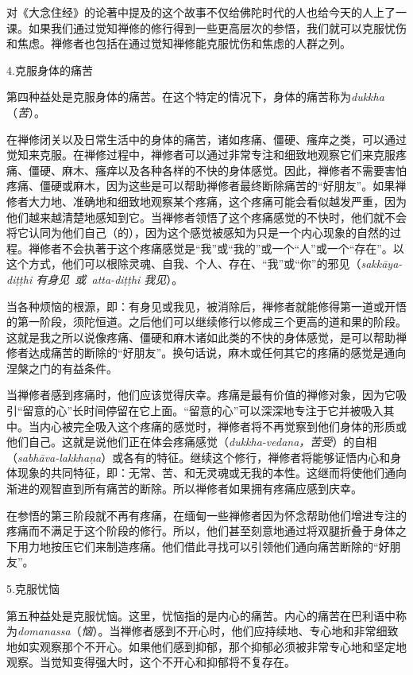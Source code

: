 对《大念住经》的论著中提及的这个故事不仅给佛陀时代的人也给今天的人上了一课。如果我们通过觉知禅修的修行得到一些更高层次的参悟，我们就可以克服忧伤和焦虑。禅修者也包括在通过觉知禅修能克服忧伤和焦虑的人群之列。

\sssubsectnon 4.克服身体的痛苦

第四种益处是克服身体的痛苦。在这个特定的情况下，身体的痛苦称为{\it dukkha}（{\it 苦}）。

在禅修闭关以及日常生活中的身体的痛苦，诸如疼痛、僵硬、瘙痒之类，可以通过觉知来克服。在禅修过程中，禅修者可以通过非常专注和细致地观察它们来克服疼痛、僵硬、\1麻木、瘙痒以及各种各样的不快的身体感觉。因此，禅修者不需要害怕疼痛、僵硬或麻木，因为这些是可以帮助禅修者最终断除痛苦的“好朋友”。如果禅修者大力地、准确地和细致地观察某个疼痛，这个疼痛可能会看似越发严重，因为他们越来越清楚地感知到它。当禅修者领悟了这个疼痛感觉的不快时，他们就不会将它认同为他们自己（的），因为这个感觉被感知为只是一个内心现象的自然的过程。禅修者不会执著于这个疼痛感觉是“我”或“我的”或一个“人”或一个“存在”。以这个方式，他们可以根除灵魂、自我、个人、存在、“我”或“你”的邪见（{\it sakk\=aya-di\d t\d thi 有身见\ 或\ atta-di\d t\d thi 我见}）。

当各种烦恼的根源，即：有身见或我见，被消除后，禅修者就能修得第一道或开悟的第一阶段，须陀恒道。之后他们可以继续修行以修成三个更高的道和果的阶段。这就是我之所以说像疼痛、僵硬和麻木诸如此类的不快的身体感觉，是可以帮助禅修者达成痛苦的断除的“好朋友”。换句话说，麻木或任何其它的疼痛的感觉是通向涅槃之门的有益条件。

当禅修者感到疼痛时，他们应该觉得庆幸。疼痛是最有价值的禅修对象，因为它吸引“留意的心”长时间停留在它上面。“留意的心”可以深深地专注于它并被吸入其中。当内心被完全吸入这个疼痛的感觉时，禅修者将\1不再觉察到他们身体的形质或他们自己。这就是说他们正在体会疼痛感觉（{\it dukkha-vedana，苦受}）的自相（{\it sabh\=ava-lakkha\d na}）或各有的特征。继续这个修行，禅修者将能够证悟内心和身体现象的共同特征，即：无常、苦、和无灵魂或无我的本性。这继而将使他们通向渐进的观智直到所有痛苦的断除。所以禅修者如果拥有疼痛应感到庆幸。

在参悟的第三阶段就不再有疼痛，在缅甸一些禅修者因为怀念帮助他们增进专注的疼痛而不满足于这个阶段的修行。所以，他们甚至刻意地通过将双腿折叠于身体之下用力地按压它们来制造疼痛。他们借此寻找可以引领他们通向痛苦断除的“好朋友”。

\sssubsectnon 5.克服忧恼

第五种益处是克服忧恼。这里，忧恼指的是内心的痛苦。内心的痛苦在巴利语中称为{\it domanassa}（{\it 恼}）。当禅修者感到不开心时，他们应持续地、专心地和非常细致地如实观察那个不开心。如果他们感到抑郁，那个抑郁必须被非常专心地和坚定地观察。当觉知变得强大时，这个不开心和抑郁将不复存在。

